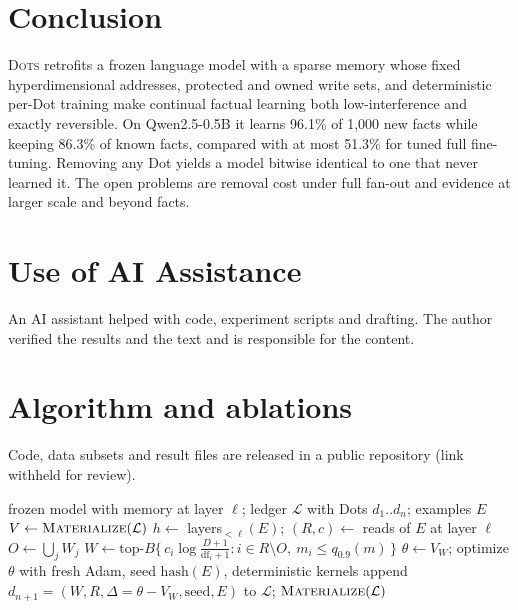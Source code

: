 \documentclass[11pt]{article}
\newcommand{\sys}{\textsc{Dots}}
\begin{document}
\section{Conclusion}

\sys{} retrofits a frozen language model with a sparse memory whose fixed hyperdimensional addresses, protected and owned write sets, and deterministic per-Dot training make continual factual learning both low-interference and exactly reversible. On Qwen2.5-0.5B it learns 96.1\% of 1{,}000 new facts while keeping 86.3\% of known facts, compared with at most 51.3\% for tuned full fine-tuning. Removing any Dot yields a model bitwise identical to one that never learned it. The open problems are removal cost under full fan-out and evidence at larger scale and beyond facts.

\section*{Use of AI Assistance}
An AI assistant helped with code, experiment scripts and drafting. The author verified the results and the text and is responsible for the content.




\appendix
\section{Algorithm and ablations}
\label{app:algo}
Code, data subsets and result files are released in a public repository (link withheld for review).

\begin{algorithm}[t]
\caption{Learning a Dot and recording it in the ledger}
\label{alg:write}
\begin{algorithmic}[1]
\Require frozen model with memory at layer $\ell$; ledger $\mathcal{L}$ with Dots $d_1..d_n$; examples $E$
\State $V \gets \textsc{Materialize}(\mathcal{L})$ 
\State $h \gets$ layers$_{<\ell}(E)$; \; $(R, c) \gets$ reads of $E$ at layer $\ell$
\State $O \gets \bigcup_j W_j$ 
\State $W \gets \mathrm{top}\text{-}B\{\, c_i \log\frac{D+1}{\mathrm{df}_i+1} : i \in R \setminus O,\ m_i \le q_{0.9}(m) \,\}$
\State $\theta \gets V_W$; optimize $\theta$ with fresh Adam, seed $\mathrm{hash}(E)$, deterministic kernels
\State append $d_{n+1} = (W, R, \Delta = \theta - V_W, \mathrm{seed}, E)$ to $\mathcal{L}$; \Return $\textsc{Materialize}(\mathcal{L})$
\end{algorithmic}
\end{algorithm}
\end{document}

